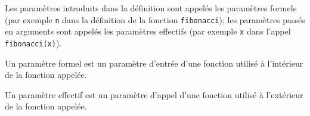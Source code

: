 Les paramètres introduits dans la définition sont appelés les paramètres formels
(par exemple {\tt n} dans la définition de la fonction {\tt fibonacci});
les paramètres passés en arguments sont appelés les paramètres effectifs
(par exemple {\tt x} dans l'appel {\tt fibonacci(x)}). 

\begin{defin}
Un paramètre formel est un paramètre d'entrée d'une fonction
utilisé à l'in\-té\-rieur de la fonction appelée.
\end{defin}

\begin{defin}
Un paramètre effectif est un paramètre d'appel d'une fonction
utilisé à l'ex\-té\-rieur de la fonction appelée.
\end{defin}


